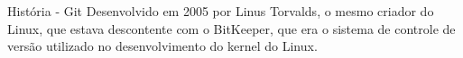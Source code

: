 
\begin{slide}[method=direct]{História - Git}
Desenvolvido em 2005 por Linus Torvalds, o mesmo criador do Linux, que
estava descontente com o BitKeeper, que era o sistema de controle de versão utilizado
no desenvolvimento do kernel do Linux.

\end{slide}
